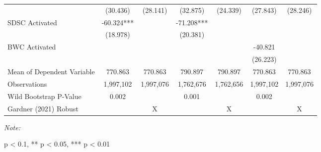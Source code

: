 \begin{table}[H]
\begin{threeparttable}
\begin{tabular}[t]{lcccccc}
\hspace{1em} & (30.436) & (28.141) & (32.875) & (24.339) & (27.843) & (28.246)\\
\hspace{1em}SDSC Activated & -60.324*** &  & -71.208*** &  &  & \\
\hspace{1em} & (18.978) &  & (20.381) &  &  & \\
\hspace{1em}BWC Activated &  &  &  &  & -40.821 & \\
\hspace{1em} &  &  &  &  & (26.223) & \\
\hspace{1em}Mean of Dependent Variable & 770.863 & 770.863 & 790.897 & 790.897 & 770.863 & 770.863\\
\hspace{1em}Observations & 1,997,102 & 1,997,076 & 1,762,676 & 1,762,656 & 1,997,102 & 1,997,076\\
\hspace{1em}Wild Bootstrap P-Value & 0.002 &  & 0.001 &  & 0.002 & \\
\midrule
Gardner (2021) Robust &  & X &  & X &  & X\\
\bottomrule
\end{tabular}
\begin{tablenotes}
\item \textit{Note: } 
\item * p < 0.1, ** p < 0.05, *** p < 0.01

\end{tablenotes}
\end{threeparttable}
\end{table}
